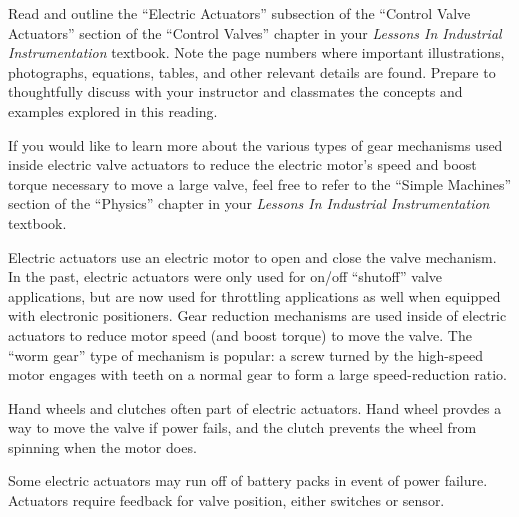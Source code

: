 
Read and outline the ``Electric Actuators'' subsection of the ``Control Valve Actuators'' section of the ``Control Valves'' chapter in your {\it Lessons In Industrial Instrumentation} textbook.  Note the page numbers where important illustrations, photographs, equations, tables, and other relevant details are found.  Prepare to thoughtfully discuss with your instructor and classmates the concepts and examples explored in this reading.

\vskip 10pt

If you would like to learn more about the various types of gear mechanisms used inside electric valve actuators to reduce the electric motor's speed and boost torque necessary to move a large valve, feel free to refer to the ``Simple Machines'' section of the ``Physics'' chapter in your {\it Lessons In Industrial Instrumentation} textbook. 













Electric actuators use an electric motor to open and close the valve mechanism.  In the past, electric actuators were only used for on/off ``shutoff'' valve applications, but are now used for throttling applications as well when equipped with electronic positioners.  Gear reduction mechanisms are used inside of electric actuators to reduce motor speed (and boost torque) to move the valve.  The ``worm gear'' type of mechanism is popular: a screw turned by the high-speed motor engages with teeth on a normal gear to form a large speed-reduction ratio.

\vskip 10pt

Hand wheels and clutches often part of electric actuators.  Hand wheel provdes a way to move the valve if power fails, and the clutch prevents the wheel from spinning when the motor does.

\vskip 10pt

Some electric actuators may run off of battery packs in event of power failure.  Actuators require feedback for valve position, either switches or sensor.












